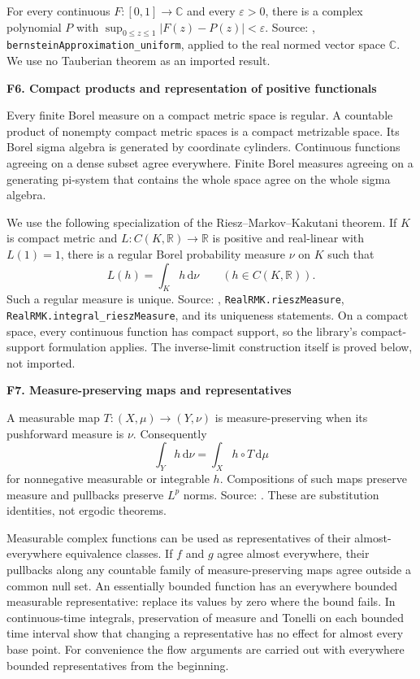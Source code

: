 \documentclass[11pt]{article}
\theoremstyle{remark}\newtheorem{remark}[theorem]{Remark}
\newcommand{\R}{\mathbb R}\newcommand{\C}{\mathbb C}
\newcommand{\dd}{\,\mathrm d}\newcommand{\tr}{\operatorname{tr}}
\newcommand{\lib}[2]{\par\medskip\noindent\textbf{#1. #2}\par}
\begin{document}
For every continuous $F:[0,1]\to\C$ and every $\varepsilon>0$, there is a complex polynomial $P$ with $\sup_{0\le z\le1}|F(z)-P(z)|<\varepsilon$. Source: \cite{ml-bernstein}, \texttt{bernsteinApproximation\_\allowbreak uniform}, applied to the real normed vector space $\C$. We use no Tauberian theorem as an imported result.

\lib{F6}{Compact products and representation of positive functionals}
Every finite Borel measure on a compact metric space is regular. A countable product of nonempty compact metric spaces is a compact metrizable space. Its Borel sigma algebra is generated by coordinate cylinders. Continuous functions agreeing on a dense subset agree everywhere. Finite Borel measures agreeing on a generating pi-system that contains the whole space agree on the whole sigma algebra.

We use the following specialization of the Riesz--Markov--Kakutani theorem. If $K$ is compact metric and $L:C(K,\R)\to\R$ is positive and real-linear with $L(1)=1$, there is a regular Borel probability measure $\nu$ on $K$ such that
\[
 L(h)=\int_K h\dd\nu\qquad(h\in C(K,\R)).
\]
Such a regular measure is unique. Source: \cite{ml-rmk}, \texttt{RealRMK.\allowbreak rieszMeasure}, \texttt{RealRMK.\allowbreak integral\_\allowbreak rieszMeasure}, and its uniqueness statements. On a compact space, every continuous function has compact support, so the library's compact-support formulation applies. The inverse-limit construction itself is proved below, not imported.

\lib{F7}{Measure-preserving maps and representatives}
A measurable map $T:(X,\mu)\to(Y,\nu)$ is measure-preserving when its pushforward measure is $\nu$. Consequently
\[
 \int_Y h\dd\nu=\int_X h\circ T\dd\mu
\]
for nonnegative measurable or integrable $h$. Compositions of such maps preserve measure and pullbacks preserve $L^p$ norms. Source: \cite{ml-mp,ml-lp}. These are substitution identities, not ergodic theorems.

Measurable complex functions can be used as representatives of their almost-everywhere equivalence classes. If $f$ and $g$ agree almost everywhere, their pullbacks along any countable family of measure-preserving maps agree outside a common null set. An essentially bounded function has an everywhere bounded measurable representative: replace its values by zero where the bound fails. In continuous-time integrals, preservation of measure and Tonelli on each bounded time interval show that changing a representative has no effect for almost every base point. For convenience the flow arguments are carried out with everywhere bounded representatives from the beginning.
\end{document}

